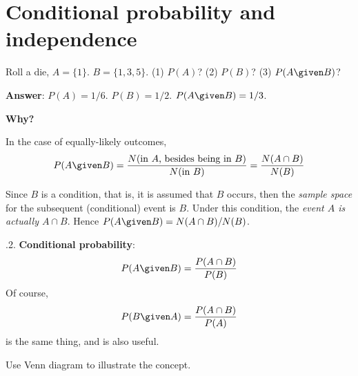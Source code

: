 \documentclass[12pt]{article}
\begin{document}


\section{Conditional probability and independence}

\example Roll a die, $A = \{1\}$. $B = \{1,3,5\}$.
(1) $P(A)$? (2) $P(B)$? (3) $P(A \given B)$?

\textbf{Answer}: $P(A) = 1/6$. $P(B) = 1/2$. $P(A \given B) = 1/3$.

\textbf{Why?}

In the case of equally-likely outcomes,
\[
P(A \given B)
= \frac{N(\text{in $A$, besides being in $B$})}{N(\text{in $B$})}
= \frac{N(A \cap B)}{N(B)}
\]

Since $B$ is a condition, that is, it is assumed that $B$ occurs,
then the \emph{sample space} for the subsequent (conditional) event
is $B$. Under this condition,
the \emph{event $A$ is actually $A \cap B$}.
Hence
$P(A \given B) = N(A \cap B) / N(B)$.


.2. \textbf{Conditional probability}:
\[
P(A \given B) = \frac{P(A \cap B)}{P(B)}
\]
Of course,
\[
P(B \given A) = \frac{P(A \cap B)}{P(A)}
\]
is the same thing, and is also useful.

Use Venn diagram to illustrate the concept.
\end{document}
